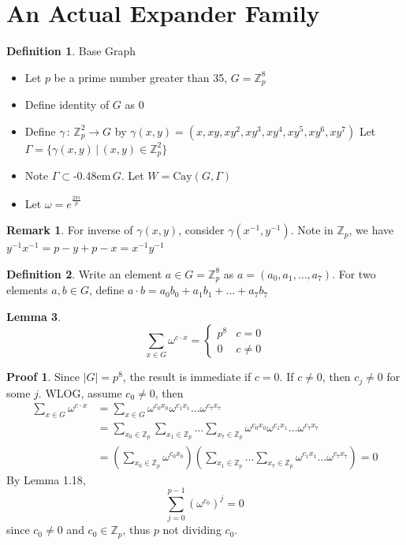 \documentclass{book}
\newcommand{\Z}{\mathbb{Z}}
\newcommand{\syin}{$\subset$\kern-0.48em\raisebox{.20ex}{\tiny S}$\,$}
\newcommand{\abs}[1]{\lvert #1 \rvert }
\newcommand{\Cay}[1]{\textrm{Cay}( #1 )}
\theoremstyle{definition}
\newtheorem{lemma}{Lemma}[chapter]
\newtheorem{definition}[lemma]{Definition}
\theoremstyle{remarkstyle}
\newtheorem*{remark}{Remark}%
\newtheorem*{myproof}{Proof}%
\begin{document}
\section{An Actual Expander Family}
\begin{definition}
    Base Graph 
    \begin{itemize}
        \item Let $p$ be a prime number greater than 35, $G=\Z^{8}_p $
        \item Define identity of $G$ as 0
        \item Define $\gamma\,:\, \Z^2_p \rightarrow G $ by $\gamma(x,y) = (x,xy,xy^2,xy^3,xy^4,xy^5,xy^6,xy^7)  $ Let $\Gamma = \{\gamma(x,y)\,\lvert\, (x,y) \in \Z^2_p\} $
        \item Note $\Gamma$\syin$G$. Let $W=\Cay{G,\Gamma}$
        \item Let $\omega=e^{\frac{2\pi i}{p}} $
    \end{itemize}
\end{definition}
\begin{remark}
    For inverse of $\gamma(x,y)$, consider $\gamma(x^{-1},y^{-1}) $. Note in $\Z_p$, we have $y^{-1}x^{-1}=p-y+p-x=x^{-1}y^{-1}$ \newline
\end{remark}

\begin{definition}
    Write an element $a\in G=\Z^8_p $ as $a=(a_0, a_1, \dots, a_7) $. For two elements $a,b\in G$, define $a\cdot b=a_0b_0+a_1b_1+\dots+a_7b_7$ \newline
\end{definition}

\begin{lemma}
    $$
    \sum_{x\in G}\omega^{c\cdot x} = \left\{ 
    \begin{array}{ll}
        p^8 & c = 0  \\
        0 & c \neq 0 
    \end{array}
    \right.
    $$
\end{lemma}
\begin{myproof}
    Since $\abs{G}=p^8$, the result is immediate if $c=0$. If $c\neq 0$, then $c_j\neq 0$ for some $j$. WLOG, assume $c_0\neq 0$, then 
    \begin{align*}
        \sum_{x\in G}\omega^{c\cdot x} 
        &= \sum_{x\in G}\omega^{c_0x_0}\omega^{c_1x_1}\dots\omega^{c_7x_7} \\
        &= \sum_{x_0\in \Z_p}\sum_{x_1\in \Z_p}\dots\sum_{x_7\in \Z_p}\omega^{c_0x_0}\omega^{c_1x_1}\dots\omega^{c_7x_7} \\
        &= \left( \sum_{x_0\in \Z_p}\omega^{c_0x_0} \right)\left(\sum_{x_1\in \Z_p}\dots\sum_{x_7\in \Z_p}\omega^{c_1x_1}\dots\omega^{c_7x_7}\right) = 0
    \end{align*}
    By Lemma 1.18, 
    $$\sum_{j=0}^{p-1} (\omega^{c_0})^{j} = 0 $$ 
    since $c_0\neq 0$ and $c_0\in \Z_p$, thus $p$ not dividing $c_0$. \newline
\end{myproof}
\end{document}
